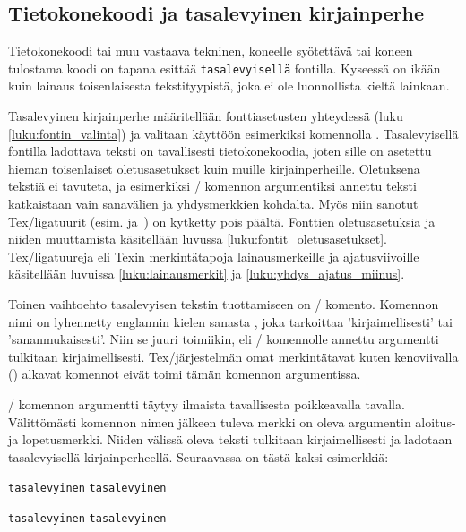 \subsection{Tietokonekoodi ja tasalevyinen kirjainperhe}

Tietokonekoodi tai muu vastaava tekninen, koneelle syötettävä tai koneen
tulostama koodi on tapana esittää \texttt{tasalevyisellä} fontilla.
Kyseessä on ikään kuin lainaus toisenlaisesta tekstityypistä, joka ei
ole luonnollista kieltä lainkaan.

Tasalevyinen kirjainperhe määritellään fonttiasetusten yhteydessä (luku
\ref{luku:fontin_valinta}) ja valitaan käyttöön esimerkiksi komennolla
. Tasalevyisellä fontilla ladottava teksti on
tavallisesti tietokonekoodia, joten sille on asetettu hieman
toisenlaiset oletusasetukset kuin muille kirjainperheille. Oletuksena
tekstiä ei tavuteta, ja esimerkiksi \-/ komennon
argumentiksi annettu teksti katkaistaan vain sanavälien ja yhdysmerkkien
kohdalta. Myös niin sanotut Tex\-/ligatuurit (esim. 
ja~\koodi{--}) on kytketty pois päältä. Fonttien oletusasetuksia ja
niiden muuttamista käsitellään luvussa
\ref{luku:fontit_oletusasetukset}. Tex\-/ligatuureja eli Texin
merkintätapoja lainausmerkeille ja ajatusviivoille käsitellään luvuissa
\ref{luku:lainausmerkit} ja \ref{luku:yhdys_ajatus_miinus}.

Toinen vaihtoehto tasalevyisen tekstin tuottamiseen on
\-/ komento. Komennon nimi on lyhennetty englannin kielen
sanasta \textit{}, joka tarkoittaa 'kirjaimellisesti'
tai 'sananmukaisesti'. Niin se juuri toimiikin, eli \-/
komennolle annettu argumentti tulkitaan kirjaimellisesti.
Tex\-/järjestelmän omat merkintätavat kuten kenoviivalla (\koodi{\keno})
alkavat komennot eivät toimi tämän komennon argumentissa.

\-/ komennon argumentti täytyy ilmaista tavallisesta
poikkeavalla tavalla. Välittömästi komennon nimen jälkeen tuleva merkki
on oleva argumentin aloitus- ja lopetusmerkki. Niiden välissä oleva
teksti tulkitaan kirjaimellisesti ja ladotaan tasalevyisellä
kirjainperheellä. Seuraavassa on tästä kaksi esimerkkiä:

\begin{koodilohkosis}
\verb.tasalevyinen.   %
\verb|tasalevyinen|   %
\end{koodilohkosis}

\begin{tulossis}
  \verb.tasalevyinen.
  \verb|tasalevyinen|
\end{tulossis}

